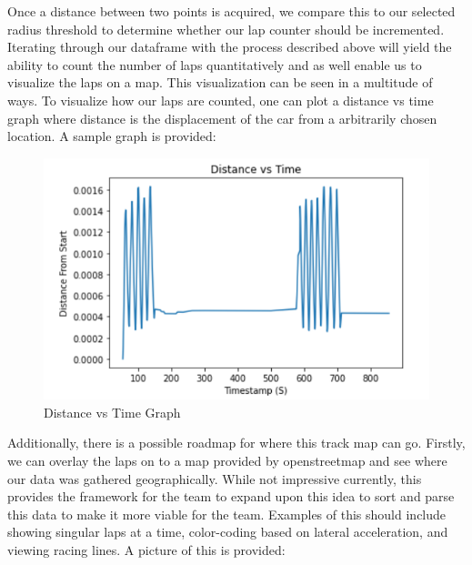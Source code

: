 Once a distance between two points is acquired, we compare this to our selected radius threshold to determine whether our lap counter should be incremented. Iterating through our dataframe with the process described above will yield the ability to count the number of laps quantitatively and as well enable us to visualize the laps on a map. This visualization can be seen in a multitude of ways. To visualize how our laps are counted, one can plot a distance vs time graph where distance is the displacement of the car from a arbitrarily chosen location. A sample graph is provided: 

\begin{figure}[H]
    \centering
    \includegraphics[width=5in]{images/distancevtime.png}
    \caption{Distance vs Time Graph}
    \label{fig:dtg}
\end{figure}

\vspace{1em}

Additionally, there is a possible roadmap for where this track map can go. Firstly, we can overlay the laps on to a map provided by openstreetmap and see where our data was gathered geographically. While not impressive currently, this provides the framework for the team to expand upon this idea to sort and parse this data to make it more viable for the team. Examples of this should include showing singular laps at a time, color-coding based on lateral acceleration, and viewing racing lines. A picture of this is provided:

